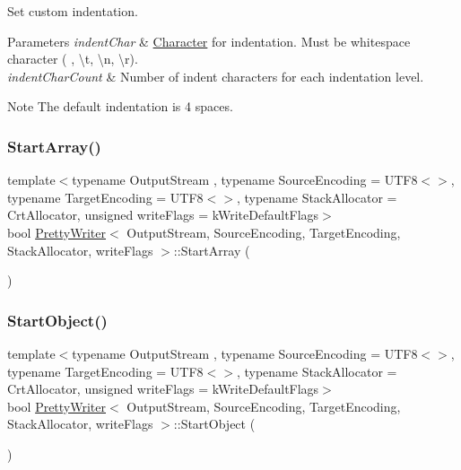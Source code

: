Set custom indentation. 


\begin{DoxyParams}{Parameters}
{\em indent\+Char} & \hyperlink{structCharacter}{Character} for indentation. Must be whitespace character (\textquotesingle{} \textquotesingle{}, \textquotesingle{}\textbackslash{}t\textquotesingle{}, \textquotesingle{}\textbackslash{}n\textquotesingle{}, \textquotesingle{}\textbackslash{}r\textquotesingle{}). \\
\hline
{\em indent\+Char\+Count} & Number of indent characters for each indentation level. \\
\hline
\end{DoxyParams}
\begin{DoxyNote}{Note}
The default indentation is 4 spaces. 
\end{DoxyNote}
\mbox{\label{classPrettyWriter_aec7fdf4798a3af5e31c147633f4798ed}} 
\subsubsection{\texorpdfstring{Start\+Array()}{StartArray()}}
{\footnotesize\ttfamily template$<$typename Output\+Stream , typename Source\+Encoding  = U\+T\+F8$<$$>$, typename Target\+Encoding  = U\+T\+F8$<$$>$, typename Stack\+Allocator  = Crt\+Allocator, unsigned write\+Flags = k\+Write\+Default\+Flags$>$ \\
bool \hyperlink{classPrettyWriter}{Pretty\+Writer}$<$ Output\+Stream, Source\+Encoding, Target\+Encoding, Stack\+Allocator, write\+Flags $>$\+::Start\+Array (\begin{DoxyParamCaption}{ }\end{DoxyParamCaption})\hspace{0.3cm}{\ttfamily [inline]}}

\mbox{\label{classPrettyWriter_a27bdda225dc152b8974e44c1df7525b7}} 
\subsubsection{\texorpdfstring{Start\+Object()}{StartObject()}}
{\footnotesize\ttfamily template$<$typename Output\+Stream , typename Source\+Encoding  = U\+T\+F8$<$$>$, typename Target\+Encoding  = U\+T\+F8$<$$>$, typename Stack\+Allocator  = Crt\+Allocator, unsigned write\+Flags = k\+Write\+Default\+Flags$>$ \\
bool \hyperlink{classPrettyWriter}{Pretty\+Writer}$<$ Output\+Stream, Source\+Encoding, Target\+Encoding, Stack\+Allocator, write\+Flags $>$\+::Start\+Object (\begin{DoxyParamCaption}{ }\end{DoxyParamCaption})\hspace{0.3cm}{\ttfamily [inline]}}

